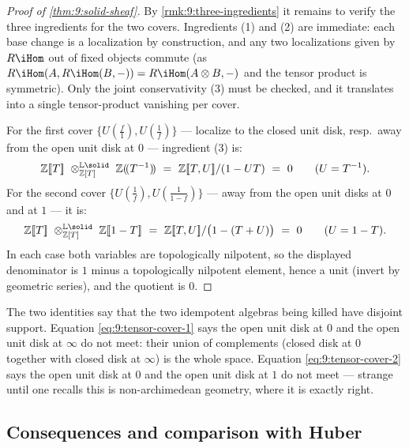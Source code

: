 \begin{proof}[Proof of \cref{thm:9:solid-sheaf}]
By \cref{rmk:9:three-ingredients} it remains to verify the three ingredients for
the two covers. Ingredients (1) and (2) are immediate: each base change is a
localization by construction, and any two localizations given by $R\iHom$ out of
fixed objects commute (as $R\iHom(A,R\iHom(B,-))=R\iHom(A\otimes B,-)$ and the
tensor product is symmetric). Only the joint conservativity (3) must be checked,
and it translates into a single tensor-product vanishing per cover.

For the first cover $\{U(\tfrac f1),U(\tfrac1f)\}$ --- localize to the closed
unit disk, resp.\ away from the open unit disk at $0$ --- ingredient (3) is:
\begin{equation}
\label{eq:9:tensor-cover-1}
\mathbb{Z}[\![T]\!]\ \otimes^{\mathbb{L}\solid}_{\mathbb{Z}[T]}\
\mathbb{Z}(\!(T^{-1})\!)\ =\ \mathbb{Z}[\![T,U]\!]/(1-UT)\ =\ 0
\qquad(U=T^{-1}).
\end{equation}
For the second cover $\{U(\tfrac1f),U(\tfrac1{1-f})\}$ --- away from the open
unit disks at $0$ and at $1$ --- it is:
\begin{equation}
\label{eq:9:tensor-cover-2}
\mathbb{Z}[\![T]\!]\ \otimes^{\mathbb{L}\solid}_{\mathbb{Z}[T]}\
\mathbb{Z}[\![1-T]\!]\ =\ \mathbb{Z}[\![T,U]\!]/\bigl(1-(T+U)\bigr)\ =\ 0
\qquad(U=1-T).
\end{equation}
In each case both variables are topologically nilpotent, so the displayed
denominator is $1$ minus a topologically nilpotent element, hence a unit (invert
by geometric series), and the quotient is $0$.
\end{proof}

\begin{remark}
\label{rmk:9:disjoint-disks}
The two identities say that the two idempotent algebras being killed have
disjoint support. Equation \eqref{eq:9:tensor-cover-1} says the open unit disk at
$0$ and the open unit disk at $\infty$ do not meet: their union of complements
(closed disk at $0$ together with closed disk at $\infty$) is the whole space.
Equation \eqref{eq:9:tensor-cover-2} says the open unit disk at $0$ and the open
unit disk at $1$ do not meet --- strange until one recalls this is
non-archimedean geometry, where it is exactly right.
\end{remark}

\subsection{Consequences and comparison with Huber}

